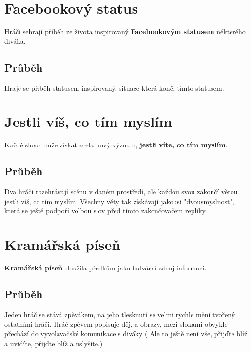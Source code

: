  
 
\needspace{5cm} \section{Facebookový status} \label{facebookový status}  
 
Hráči sehrají příběh ze života inspirovaný  \textbf{Facebookovým statusem}{} některého diváka. 
 
\subsection{Průběh} Hraje se příběh statusem inspirovaný, situace která končí tímto statusem.  
 
 
 
\needspace{5cm} \section{Jestli víš, co tím myslím} \label{jestli víš, co tím myslím}  
 
Každé slovo může získat zcela nový význam, \textbf{jestli víte, co tím myslím}{}. 
 
\subsection{Průběh} Dva hráči rozehrávají scénu v daném prostředí, ale každou svou  zakončí  
větou jestli víš, co tím myslím. Všechny věty tak získávají jakousi "dvousmyslnost", která se ještě podpoří volbou slov před tímto zakončovačem repliky.   
 
 
 
\needspace{5cm} \section{Kramářská píseň} \label{kramářská píseň}  
 
\textbf{Kramářská píseň}{} sloužila předkům jako bulvární zdroj informací. 
 
\subsection{Průběh} Jeden hráč se stává zpěvákem, na jeho tlesknutí se velmi rychle mění  tvořený ostatními hráči. 
Hráč zpěvem popisuje děj, a obrazy, mezi slokami obvykle přechází do vyvolavačské komunikace s diváky ( Ale to ještě není vše, přijďte blíž a uvidíte, přijďte blíž a uslyšíte.) 
 
